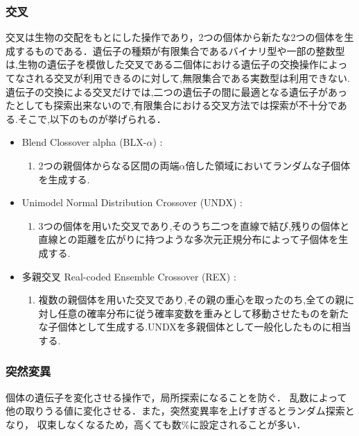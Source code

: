 \subsubsection{交叉}
交叉は生物の交配をもとにした操作であり，2つの個体から新たな2つの個体を生成するものである．遺伝子の種類が有限集合であるバイナリ型や一部の整数型は,生物の遺伝子を模倣した交叉である二個体における遺伝子の交換操作によってなされる交叉が利用できるのに対して,無限集合である実数型は利用できない.遺伝子の交換による交叉だけでは,二つの遺伝子の間に最適となる遺伝子があったとしても探索出来ないので,有限集合における交叉方法では探索が不十分である.そこで,以下のものが挙げられる．
\begin{itemize}
	\setlength{\leftskip}{0mm}
	\item Blend Clossover alpha (BLX-$\alpha$) : 
        \begin{enumerate}\setlength{\leftskip}{5mm}
            \item[] 2つの親個体からなる区間の両端$\alpha$倍した領域においてランダムな子個体を生成する.
        \end{enumerate}
        
	\item Unimodel Normal Distribution Crossover (UNDX)\cite{ono1999robust} : 
        \begin{enumerate}\setlength{\leftskip}{5mm}
            \item[] 3つの個体を用いた交叉であり,そのうち二つを直線で結び,残りの個体と直線との距離を広がりに持つような多次元正規分布によって子個体を生成する.
        \end{enumerate}
 
        \item 多親交叉 Real-coded Ensemble Crossover (REX)\cite{小林重信2009実数値} : 
         \begin{enumerate}\setlength{\leftskip}{5mm}
            \item[] 複数の親個体を用いた交叉であり,その親の重心を取ったのち,全ての親に対し任意の確率分布に従う確率変数を重みとして移動させたものを新たな子個体として生成する.UNDXを多親個体として一般化したものに相当する.
        \end{enumerate}
\end{itemize}

\subsubsection{突然変異}
個体の遺伝子を変化させる操作で，局所探索になることを防ぐ．
乱数によって他の取りうる値に変化させる．また，突然変異率を上げすぎるとランダム探索となり，
収束しなくなるため，高くても数\%に設定されることが多い．

